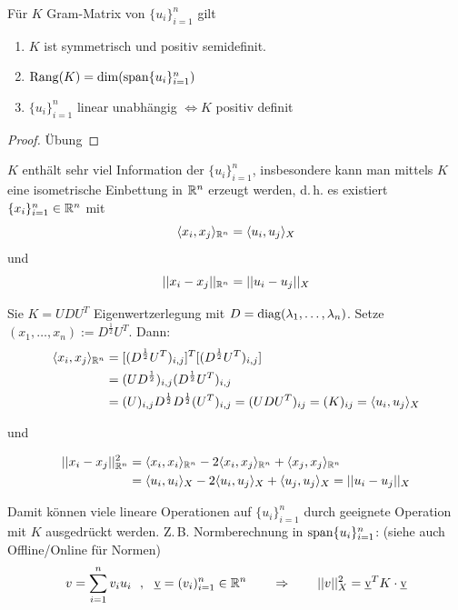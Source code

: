 \begin{lemma}
Für $K$ Gram-Matrix von $\{u_i\}_{i=1}^n$ gilt
\begin{enumerate}
	\item $K$ ist symmetrisch und positiv semidefinit.
	\item $\operatorname{Rang}(K) = \dim (\operatorname{span}\{u_i\}_{i=1}^n)$
	\item $\{u_i\}_{i=1}^n$ linear unabhängig $\Leftrightarrow K$ positiv definit
\end{enumerate}
\end{lemma}

\begin{proof}
	Übung
\end{proof}

\begin{bem}
$K$ enthält sehr viel Information der $\{u_i\}_{i=1}^n$, insbesondere kann man mittels $K$ eine isometrische Einbettung in $\mathbb{R}^n$ erzeugt werden, d.\,h. es existiert $\{x_i\}_{i=1}^n \in \mathbb{R}^n$ mit 
\[
	\langle x_i, x_j \rangle_{\mathbb{R}^n} = \langle u_i, u_j \rangle_X
\] 
und 
\[
	||x_i - x_j ||_{\mathbb{R}^n} = ||u_i - u_j||_X
\]

Sie $K = UDU^T$ Eigenwertzerlegung mit $D= \operatorname{diag}(\lambda_1,\dots,\lambda_n)$. Setze $(x_1,\dots,x_n):=D^{\frac{1}{2}}U^T$.
Dann:
\begin{align*}
	\langle x_i, x_j \rangle_{\mathbb{R}^n} &= [(D^{\frac{1}{2}}U^T)_{i,j}]^T[(D^{\frac{1}{2}}U^T)_{i,j}]  \\
	&= (UD^{\frac{1}{2}})_{i,j} (D^{\frac{1}{2}} U^T)_{i,j} \\
	&= (U)_{i,j} D^{\frac{1}{2}} D^{\frac{1}{2}} (U^T)_{i,j} = (UDU^T)_{ij} = (K)_{ij} =\langle u_i, u_j \rangle_X
\end{align*}

und

\begin{align*}
	||x_i-x_j||_{\mathbb{R}^n}^2 &= \langle x_i, x_i \rangle_{\mathbb{R}^n} - 2 \langle x_i, x_j \rangle_{\mathbb{R}^n} + \langle x_j, x_j \rangle_{\mathbb{R}^n} \\
	&= \langle u_i, u_i \rangle_{X} - 2 \langle u_i, u_j \rangle_{X} + \langle u_j, u_j \rangle_{X} = ||u_i-u_j||_X
\end{align*}

Damit können viele lineare Operationen auf $\{u_i\}_{i=1}^n$ durch geeignete Operation mit $K$ ausgedrückt werden. Z.\,B. Normberechnung in $\operatorname{span}\{u_i\}_{i=1}^n$: (siehe auch Offline/Online für Normen)
\[
	v= \sum\limits_{i=1}^n v_i u_i \,\,\,\, , \,\,\,\, \underbar v= (v_i)_{i=1}^n \in \mathbb{R}^n \qquad \Rightarrow \qquad ||v||_X^2 = \underbar v^T K \cdot \underbar v
\]

\end{bem}

